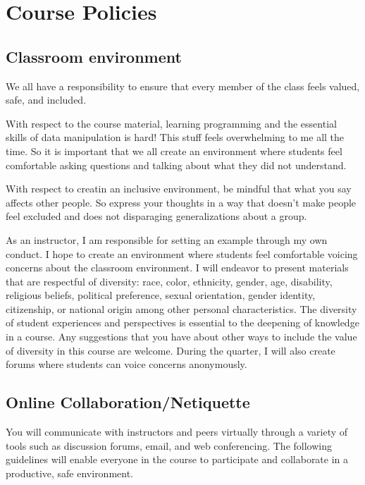 \documentclass[11pt,]{article}
\begin{document}
\section{Course Policies}\label{course-policies}

\subsection{Classroom environment}\label{classroom-environment}

We all have a responsibility to ensure that every member of the class
feels valued, safe, and included.

With respect to the course material, learning programming and the
essential skills of data manipulation is hard! This stuff feels
overwhelming to me all the time. So it is important that we all create
an environment where students feel comfortable asking questions and
talking about what they did not understand.

With respect to creatin an inclusive environment, be mindful that what
you say affects other people. So express your thoughts in a way that
doesn't make people feel excluded and does not disparaging
generalizations about a group.

As an instructor, I am responsible for setting an example through my own
conduct. I hope to create an environment where students feel comfortable
voicing concerns about the classroom environment. I will endeavor to
present materials that are respectful of diversity: race, color,
ethnicity, gender, age, disability, religious beliefs, political
preference, sexual orientation, gender identity, citizenship, or
national origin among other personal characteristics. The diversity of
student experiences and perspectives is essential to the deepening of
knowledge in a course. Any suggestions that you have about other ways to
include the value of diversity in this course are welcome. During the
quarter, I will also create forums where students can voice concerns
anonymously.

\subsection{Online
Collaboration/Netiquette}\label{online-collaborationnetiquette}

You will communicate with instructors and peers virtually through a
variety of tools such as discussion forums, email, and web conferencing.
The following guidelines will enable everyone in the course to
participate and collaborate in a productive, safe environment.
\end{document}
